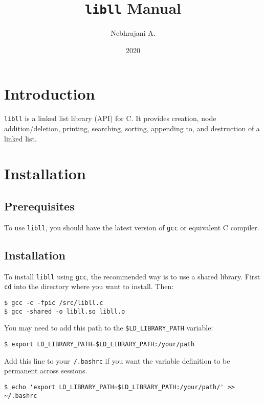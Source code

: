 \documentclass{article}
\title{\texttt{libll} Manual}
\author{Nebhrajani A.}
\date{2020}
\begin{document}
\maketitle
\tableofcontents
\newpage

\section{Introduction}
\texttt{libll} is a linked list library (API) for C. It provides creation, node addition/deletion,
printing, searching, sorting, appending to, and destruction of a linked list.

\section{Installation}

\subsection{Prerequisites}
To use \texttt{libll}, you should have the latest version of \texttt{gcc} or equivalent C compiler.

\subsection{Installation}
To install \texttt{libll} using \texttt{gcc}, the recommended way is to use a shared library. First \texttt{cd} into the directory where you want to install. Then:
\begin{verbatim}
$ gcc -c -fpic /src/libll.c
$ gcc -shared -o libll.so libll.o
\end{verbatim}

You may need to add this path to the \verb|$LD_LIBRARY_PATH| variable:
\begin{verbatim}
$ export LD_LIBRARY_PATH=$LD_LIBRARY_PATH:/your/path
\end{verbatim}
Add this line to your\texttt{~/.bashrc} if you want the variable definition to be permanent across sessions.
\begin{verbatim}
$ echo 'export LD_LIBRARY_PATH=$LD_LIBRARY_PATH:/your/path/' >> ~/.bashrc
\end{verbatim}

\end{document}
